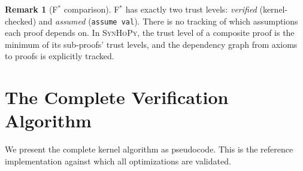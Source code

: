 \documentclass[11pt,a4paper]{report}
\theoremstyle{definition}
\newtheorem{remark}[definition]{Remark}
\theoremstyle{plain}
\newcommand{\fstar}{F$^{*}$}
\newcommand{\synhopy}{\textsc{SynHoPy}}
\begin{document}
\begin{remark}[\fstar{} comparison]
\fstar{} has exactly two trust levels: \emph{verified} (kernel-checked) and
\emph{assumed} (\lstinline[style=fstar]{assume val}). There is no tracking of
which assumptions each proof depends on. In \synhopy{}, the trust level of a
composite proof is the minimum of its sub-proofs' trust levels, and the dependency
graph from axioms to proofs is explicitly tracked.
\end{remark}


\section{The Complete Verification Algorithm}
\label{sec:verification-algorithm}

We present the complete kernel algorithm as pseudocode.  This is the reference
implementation against which all optimizations are validated.
\end{document}
